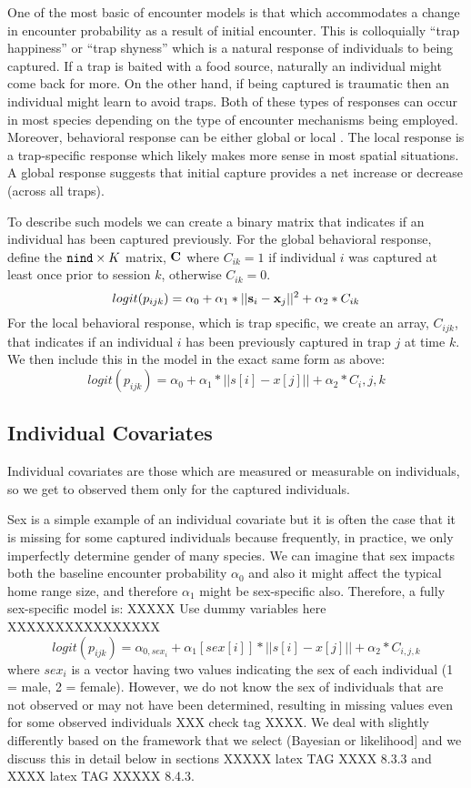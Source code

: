One of the most basic of encounter models is that which accommodates a
change in encounter probability as a result of initial encounter.
This is colloquially ``trap happiness'' or ``trap shyness'' which is a
natural response of individuals to being captured. If a trap is baited
with a food source, naturally an individual might come back for
more. On the other hand, if being captured is traumatic then an
individual might learn to avoid traps. Both of these types of
responses can occur in most species depending on the type of encounter
mechanisms being employed. Moreover, behavioral response can be either
global \citep{gardner_etal:2010} or local \citep{royle_etal:2009jwm}.
The local response is a trap-specific response which likely makes more
sense in most spatial situations. A global response suggests that
initial capture provides a net increase or decrease (across all
traps).

To describe such models we can create a binary matrix that indicates
if an individual has been captured previously.  For the global
behavioral response, define the $\mbox{\tt nind} \times K$ matrix,
${\bf C}$ where $C_{ik} =1$
if individual $i$ was captured at least once prior to session
$k$, otherwise $C_{ik} = 0$.
\[
logit(p_{ijk}) = \alpha_{0} + \alpha_1 *||{\bf s}_{i}-{\bf x}_{j}||^{2} + \alpha_2*C_{ik}
\]
For the local behavioral response, which is trap specific, we create
an array, $C_{ijk}$, that indicates if an individual $i$ has been
previously captured in trap $j$ at time $k$.  We then include this in
the model in the exact same form as above:
\[
logit(p_{ijk}) = \alpha_{0} + \alpha_1*||s[i]-x[j]|| + \alpha_2*C_i,j,k	
\]


\subsection{Individual Covariates}

Individual covariates are those which are measured or measurable on
individuals, so we get to observed them only for the captured
individuals. 

Sex is a simple example of an individual covariate but it is often the
case that it is missing for some captured individuals because 
frequently, in practice, we only imperfectly determine gender of many
species. We can imagine that sex impacts both the baseline encounter
probability $\alpha_{0}$ and also it might affect the typical home range
size, and therefore  $\alpha_{1}$ might be sex-specific
also. Therefore, a fully sex-specific model is:
XXXXX Use dummy variables here XXXXXXXXXXXXXXXX
\[
logit(p_{ijk}) = \alpha_{0,sex_{i}} + \alpha_1[sex[i]]*||s[i]-x[j]|| + \alpha_2*C_{i,j,k}
\]
where $sex_{i}$ is a vector  having two values indicating the sex of
each individual (1 = male, 2 = female).  However, we do not know the
sex of individuals that are not observed or may not have been
determined, resulting in missing values even for some observed
individuals \citep{gardner_etal:2010jwm} XXX check tag XXXX. 
We deal with slightly differently based on the framework
that we select (Bayesian or likelihood] and we discuss this in detail
below in sections XXXXX latex TAG XXXX 8.3.3 and XXXX latex TAG XXXXX 8.4.3.

